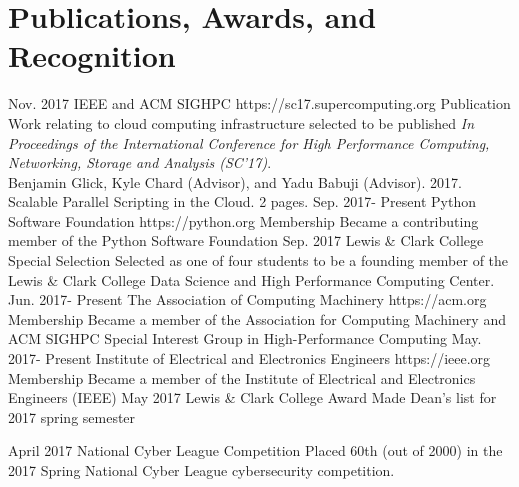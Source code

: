 \documentclass[10pt]{article} %
\begin{document}


\section{Publications, Awards, and Recognition}
\award
{Nov. 2017}
{ }
{IEEE and ACM SIGHPC}
{https://sc17.supercomputing.org}
{Publication}
{Work relating to cloud computing infrastructure selected to be published \textit{In Proceedings of the International Conference for High Performance Computing, Networking, Storage and Analysis (SC'17)}. \\ Benjamin Glick, Kyle Chard (Advisor), and Yadu Babuji (Advisor). 2017. Scalable Parallel Scripting in the Cloud. 2 pages.}
\award
{Sep. 2017-}
{Present}
{Python Software Foundation}
{https://python.org}
{Membership}
{Became a contributing member of the Python Software Foundation}
\award
{Sep. 2017}
{ }
{Lewis \& Clark College}
{ }
{Special Selection}
{Selected as one of four students to be a founding member of the Lewis \& Clark College Data Science and High Performance Computing Center.}
\award
{Jun. 2017-}
{Present}
{The Association of Computing Machinery}
{https://acm.org}
{Membership}
{Became a member of the Association for Computing Machinery and ACM SIGHPC Special Interest Group in High-Performance Computing}
\award
{May. 2017-}
{Present}
{Institute of Electrical and Electronics Engineers}
{https://ieee.org}
{Membership}
{Became a member of the Institute of Electrical and Electronics Engineers (IEEE)}
\award
{May 2017}
{ }
{Lewis \& Clark College}
{}
{Award}
{Made Dean's list for 2017 spring semester}

\award
{April 2017}
{ }
{National Cyber League}
{Competition}
{Placed 60th (out of 2000) in the 2017 Spring National Cyber League cybersecurity competition.}
\end{document}
